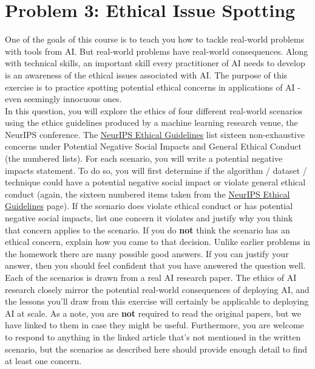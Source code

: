 \documentclass{article}
\theoremstyle{case}
\theoremstyle{definition}
\begin{document}
\newpage
\section*{Problem 3: Ethical Issue Spotting}
One of the goals of this course is to teach you how to tackle real-world problems with tools from AI.  But real-world problems have real-world consequences. Along with technical skills, an important skill every practitioner of AI needs to develop is an awareness of the ethical issues associated with AI. The purpose of this exercise is to practice spotting potential ethical concerns in applications of AI - even seemingly innocuous ones. \\
In this question, you will explore the ethics of four different real-world scenarios using the ethics guidelines produced by a machine learning research venue, the NeurIPS conference. The \underline{\href{https://neurips.cc/public/EthicsGuidelines}{NeurIPS Ethical Guidelines}} list sixteen non-exhaustive concerns under Potential Negative Social Impacts and General Ethical Conduct (the numbered lists). For each scenario, you will write a potential negative impacts statement. To do so, you will first determine if the algorithm / dataset / technique could have a potential negative
social impact or violate general ethical conduct (again, the sixteen numbered items taken from the \underline{\href{https://neurips.cc/public/EthicsGuidelines}{NeurIPS Ethical Guidelines}} page). If the scenario does violate ethical conduct or has potential negative social impacts, list one concern it violates and justify why you think that concern applies to the scenario. If you do \textbf{not} think the scenario has an ethical concern, explain how you came to that decision. 
Unlike earlier problems in the homework there are many possible good answers. If you can justify your answer, then you should feel confident that you have answered the question well. \\
Each of the scenarios is drawn from a real AI research paper. The ethics of AI research closely mirror the potential real-world consequences of deploying AI, and the lessons you’ll draw from this exercise will certainly be applicable to deploying AI at scale. As a note, you are \textbf{not} required to read the original papers, but we have linked to them in case they might be useful. Furthermore, you are welcome to respond to anything in the linked article that's not mentioned in the written scenario, but the scenarios as described here should provide enough detail to find at least one concern.
\end{document}
